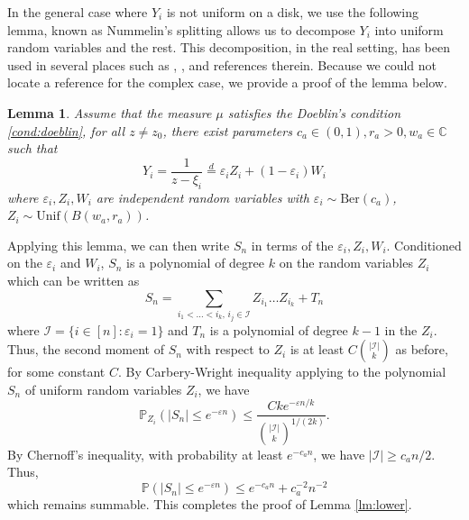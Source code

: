 \documentclass[12pt, reqno]{amsart}
\theoremstyle{plain}
\newtheorem{lemma}[theorem]{Lemma}
\theoremstyle{definition}
\newcommand\C{{\mathbb{C}}}
\renewcommand\P{{\mathbb{P}}}
\newcommand{\ep}{\varepsilon}
\begin{document}
 
 In the general case where $Y_i$ is not uniform on a disk, we use the following lemma, known as Nummelin's splitting allows us to decompose $Y_i$ into uniform random variables and the rest. This decomposition, in the real setting, has been used in several places such as \cite{poly2012dirichlet}, \cite{nourdin2015invariance}, \cite{BallyCaramellino2019} and references therein. Because we could not locate a reference for the complex case, we provide a proof of the lemma below.
 
 \begin{lemma}\label{lm:splitting}
 	Assume that the measure $\mu$ satisfies the Doeblin's condition \ref{cond:doeblin}, for all $z\neq z_0$, there exist parameters $c_a\in (0, 1), r_a>0, w_a\in \C$ such that  
 	$$Y_i = \frac{1}{z-\xi_i} \overset{d}{=} \ep_i Z_i + (1-\ep_i)W_i$$
 	where $\ep_i, Z_i, W_i$ are independent random variables with $\ep_i\sim \text{Ber}(c_a)$, $Z_i\sim \text{Unif}(B(w_a, r_a))$.
 \end{lemma}
 Applying this lemma, we can then write $S_n$ in terms of the $\ep_i, Z_i, W_i$.
 Conditioned on the $\ep_i$ and $W_i$, $S_n$ is a polynomial of degree $k$ on the random variables $Z_i$ which can be written as
 $$S_n = \sum_{i_1<\dots<i_k,\, i_j\in \mathcal I} Z_{i_1}\dots Z_{i_k}+T_n$$
 where $\mathcal I = \{i\in [n]: \ep_i=1\}$ and $T_n$ is a polynomial of degree $k-1$ in the $Z_i$.
 Thus, the second moment of $S_n$ with respect to $Z_i$ is at least $C{{|\mathcal I|}\choose k}$ as before, for some constant $C$.
 By Carbery-Wright inequality applying to the polynomial $S_n$ of uniform random variables $Z_i$, we have
 $$\P_{Z_i}(|S_n|\le e^{-\ep n})\le \frac{C ke^{-\ep n/k}}{{{|\mathcal I|}\choose k}^{1/(2k)}}.$$
 By Chernoff's inequality, with probability at least $e^{-c_{a}n}$, we have $|\mathcal I|\ge c_an/2$. Thus, 
 $$\P(|S_n|\le e^{-\ep n})\le e^{-c_{a}n}+ c_a^{-2}n^{-2}$$
 which remains summable. This completes the proof of Lemma \ref{lm:lower}.
 
\end{document}
